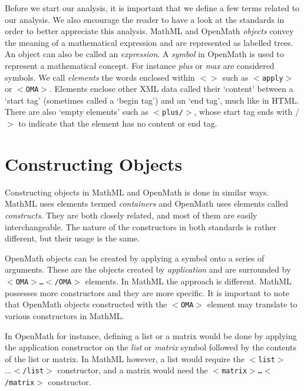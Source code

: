 Before we start our analysis, it is important that we define a few
terms related to our analysis. We also encourage the reader to have a
look at the standards in order to better appreciate this analysis.  
MathML and OpenMath {\it
objects}
convey the meaning of a mathematical expression and are represented as
labelled trees. An object can also be called an {\it expression}. A
{\it symbol} in OpenMath is used to
represent a mathematical concept. For instance {\it plus} or {\it max}
are considered symbols. We call {\it elements} the words enclosed
within \texttt{$<$$>$} such as \texttt{$<$apply$>$} or
\texttt{$<$OMA$>$}. Elements enclose other XML data called their
`content' between a `start tag' (sometimes called a `begin tag') and an
`end tag', much like in HTML. There are also `empty
elements' such as \texttt{$<$plus/$>$}, whose start tag ends with /$>$
to indicate that the element has no content or end tag.

\section{Constructing Objects} \label{constructors}

Constructing objects in MathML and OpenMath is done in similar ways.
MathML uses elements termed {\it containers} and OpenMath uses elements
called {\it constructs}.  They are both closely related, and most of
them are easily interchangeable. The nature of the
constructors in both standards is rather different,
but their usage is the same.

OpenMath objects can be created by applying a symbol onto a series of
arguments.  These are the objects created by {\it application} and are
surrounded by \texttt{$<$OMA$>$\ldots$<$/OMA$>$} elements. In MathML
the approach is different. MathML possesses more constructors and they
are more specific.  It is important to note that OpenMath objects
constructed with the \texttt{$<$OMA$>$} element may translate to
various constructors in MathML.

In OpenMath for instance, defining a list or a matrix would be done by
applying the application constructor on the {\it list} or {\it matrix}
symbol followed by the contents of the list or matrix. In MathML
however, a list would require the \texttt{$<$list$>$$\ldots<$/list$>$}
constructor, and a matrix would need the
\texttt{$<$matrix$>$\ldots$<$/matrix$>$} constructor.

